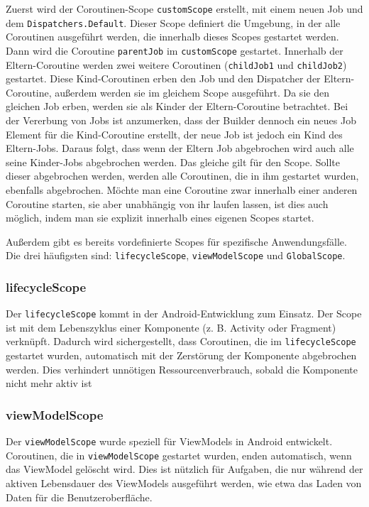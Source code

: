 \documentclass[fontsize=12pt,paper=a4,twoside=semi,parskip=half-,headsepline,headinclude]{scrreprt}
\begin{document}
Zuerst wird der Coroutinen-Scope \texttt{customScope} erstellt, mit einem neuen Job und dem \texttt{Dispatchers.Default}. Dieser Scope definiert die Umgebung, in der alle Coroutinen ausgeführt werden, die innerhalb dieses Scopes gestartet werden. Dann wird die Coroutine \texttt{parentJob} im \texttt{customScope} gestartet. Innerhalb der Eltern-Coroutine werden zwei weitere Coroutinen (\texttt{childJob1} und \texttt{childJob2}) gestartet. Diese Kind-Coroutinen erben den Job und den Dispatcher der Eltern-Coroutine, außerdem werden sie im gleichem Scope ausgeführt. Da sie den gleichen Job erben, werden sie als Kinder der Eltern-Coroutine betrachtet. Bei der Vererbung von Jobs ist anzumerken, dass der Builder dennoch ein neues Job Element für die Kind-Coroutine erstellt, der neue Job ist jedoch ein Kind des Eltern-Jobs. Daraus folgt, dass wenn der Eltern Job abgebrochen wird auch alle seine Kinder-Jobs abgebrochen werden. Das gleiche gilt für den Scope. Sollte dieser abgebrochen werden, werden alle Coroutinen, die in ihm gestartet wurden, ebenfalls abgebrochen. Möchte man eine Coroutine zwar innerhalb einer anderen Coroutine starten, sie aber unabhängig von ihr laufen lassen, ist dies auch möglich, indem man sie explizit innerhalb eines eigenen Scopes startet.

Außerdem gibt es bereits vordefinierte Scopes für spezifische Anwendungsfälle. Die drei häufigsten sind: \texttt{lifecycleScope}, \texttt{viewModelScope} und \texttt{GlobalScope}.

\subsubsection{lifecycleScope}

Der \texttt{lifecycleScope} kommt in der Android-Entwicklung zum Einsatz. Der Scope ist mit dem Lebenszyklus einer Komponente (z. B. Activity oder Fragment) verknüpft. Dadurch wird sichergestellt, dass Coroutinen, die im \texttt{lifecycleScope} gestartet wurden, automatisch mit der Zerstörung der Komponente abgebrochen werden. Dies verhindert unnötigen Ressourcenverbrauch, sobald die Komponente nicht mehr aktiv ist

\subsubsection{viewModelScope}

Der \texttt{viewModelScope} wurde speziell für ViewModels in Android entwickelt. Coroutinen, die in \texttt{viewModelScope} gestartet wurden, enden automatisch, wenn das ViewModel gelöscht wird. Dies ist nützlich für Aufgaben, die nur während der aktiven Lebensdauer des ViewModels ausgeführt werden, wie etwa das Laden von Daten für die Benutzeroberfläche.
\end{document}
